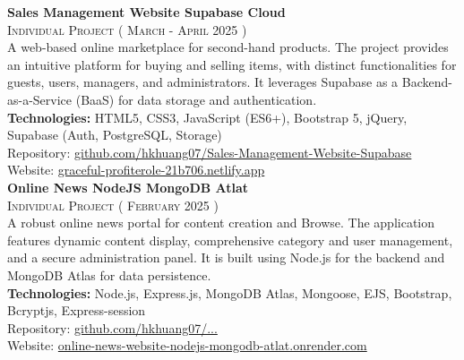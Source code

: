 \documentclass[oneside]{article}
\begin{document}
{\begin{minipage}[t][\dimexpr\textheight-2\fboxrule-2\fboxsep\relax][t]{\dimexpr0.6\textwidth-2\fboxrule-2\fboxsep\relax}
\begin{justify}
        {\large \textbf{Sales Management Website \textendash{} Supabase Cloud }} \\
        {\scshape{}\selectfont\footnotesize Individual Project \qquad ( March - April 2025 )} \\
        A web-based online marketplace for second-hand products. The project provides an intuitive platform for buying and selling items, with distinct functionalities for guests, users, managers, and administrators. It leverages Supabase as a Backend-as-a-Service (BaaS) for data storage and authentication. \\[1ex]
        \textbf{Technologies:} HTML5, CSS3, JavaScript (ES6+), Bootstrap 5, jQuery, Supabase (Auth, PostgreSQL, Storage) \\
        Repository: \href{https://github.com/hkhuang07/Sales-Management-Website-Supabase}{github.com/hkhuang07/Sales-Management-Website-Supabase} \\
        Website: \href{https://graceful-profiterole-21b706.netlify.app/}{graceful-profiterole-21b706.netlify.app} \\

        {\large \textbf{Online News \textendash{} NodeJS \textendash{} MongoDB Atlat}} \\
        {\scshape{}\selectfont\footnotesize Individual Project \qquad ( February 2025 )} \\
        A robust online news portal for content creation and Browse. The application features dynamic content display, comprehensive category and user management, and a secure administration panel. It is built using Node.js for the backend and MongoDB Atlas for data persistence. \\[1ex]
        \textbf{Technologies:} Node.js, Express.js, MongoDB Atlas, Mongoose, EJS, Bootstrap, Bcryptjs, Express-session \\
        Repository: \href{https://github.com/hkhuang07/Online-News-Site-NodeJS-MongoDB-Atlat}{github.com/hkhuang07/...} \\
        Website: \href{https://online-news-website-nodejs-mongodb-atlat.onrender.com/}{online-news-website-nodejs-mongodb-atlat.onrender.com}\\
        

\end{justify}
\end{minipage}}
\end{document}
